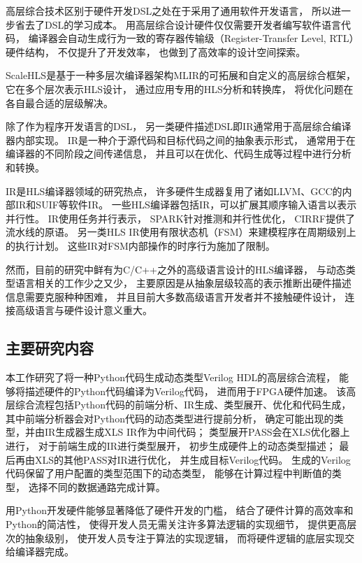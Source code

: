 高层综合技术区别于硬件开发DSL之处在于采用了通用软件开发语言，
所以进一步省去了DSL的学习成本。
用高层综合设计硬件仅仅需要开发者编写软件语言代码，
编译器会自动生成行为一致的寄存器传输级（Register-Transfer Level, RTL）硬件结构，
不仅提升了开发效率，
也做到了高效率的设计空间探索。

ScaleHLS\cite{scalehls}是基于一种多层次编译器架构MLIR\cite{mlir}的可拓展和自定义的高层综合框架，
它在多个层次表示HLS设计，
通过应用专用的HLS分析和转换库，
将优化问题在各自最合适的层级解决。

除了作为程序开发语言的DSL，
另一类硬件描述DSL即IR通常用于高层综合编译器内部实现。
IR是一种介于源代码和目标代码之间的抽象表示形式，
通常用于在编译器的不同阶段之间传递信息，
并且可以在优化、代码生成等过程中进行分析和转换。

IR是HLS编译器领域的研究热点，
许多硬件生成器复用了诸如LLVM、GCC的内部IR和SUIF等软件IR。
一些HLS编译器包括IR，可以扩展其顺序输入语言以表示并行性。
\mu IR\cite{muir}使用任务并行表示，
SPARK\cite{spark}针对推测和并行性优化，
CIRRF\cite{cirrf}提供了流水线的原语。
另一类HLS IR使用有限状态机（FSM）来建模程序在周期级别上的执行计划。
这些IR对FSM内部操作的时序行为施加了限制。

然而，目前的研究中鲜有为C/C++之外的高级语言设计的HLS编译器，
与动态类型语言相关的工作少之又少，
主要原因是从抽象层级较高的表示推断出硬件描述信息需要克服种种困难，
并且目前大多数高级语言开发者并不接触硬件设计，
连接高级语言与硬件设计意义重大。

\subsection{主要研究内容}

本工作研究了将一种Python代码生成动态类型Verilog HDL的高层综合流程，
能够将描述硬件的Python代码编译为Verilog代码，
进而用于FPGA硬件加速。
该高层综合流程包括Python代码的前端分析、IR生成、类型展开、优化和代码生成，
其中前端分析器会对Python代码的动态类型进行提前分析，
确定可能出现的类型，并由IR生成器生成XLS IR作为中间代码；
类型展开PASS会在XLS优化器上进行，
对于前端生成的IR进行类型展开，
初步生成硬件上的动态类型描述；
最后再由XLS的其他PASS对IR进行优化，
并生成目标Verilog代码。
生成的Verilog代码保留了用户配置的类型范围下的动态类型，
能够在计算过程中判断值的类型，
选择不同的数据通路完成计算。

用Python开发硬件能够显著降低了硬件开发的门槛，
结合了硬件计算的高效率和Python的简洁性，
使得开发人员无需关注许多算法逻辑的实现细节，
提供更高层次的抽象级别，
使开发人员专注于算法的实现逻辑，
而将硬件逻辑的底层实现交给编译器完成。

